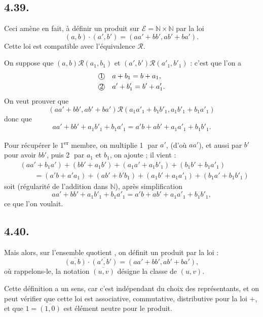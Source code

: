 \subsection*{4.39.}
Ceci amène en fait, à définir un produit sur $\mathcal E=\mathbb N\times\mathbb N$ par la loi
\[
(a,b)\cdot(a',b')=(aa'+bb',ab'+ba').
\]
Cette loi est compatible avec l'équivalence $\mathcal R$.

On suppose que $(a,b)\mathcal R(a_1,b_1)$ et $(a',b')\mathcal R(a'_1,b'_1)$ : c'est que l'on a
\begin{align*}
\text{\textcircled{1}}\quad &a+b_1=b+a_1,\\
\text{\textcircled{2}}\quad &a'+b'_1=b'+a'_1.
\end{align*}
On veut prouver que
\[
(aa'+bb',ab'+ba')\mathcal R(a_1a'_1+b_1b'_1,a_1b'_1+b_1a'_1)
\]
donc que
\[
aa'+bb'+a_1b'_1+b_1a'_1
=a'b+ab'+a_1a'_1+b_1b'_1.
\]

Pour récupérer le 1\textsuperscript{er} membre, on multiplie \textcircled{1} par $a'$, (d'où $aa'$), et aussi par $b'$ pour avoir $bb'$, puis \textcircled{2} par $a_1$ et $b_1$, on ajoute ; il vient :
\begin{align*}
&(aa'+b_1a')+(bb'+a_1b')+(a_1a'+a_1b'_1)+(b_1b'+b_1a'_1)\\
&\qquad=(a'b+a'a_1)+(ab'+b'b_1)+(a_1b'+a_1a'_1)+(b_1a'+b_1b'_1)
\end{align*}
soit (régularité de l'addition dans $\mathbb N$), après simplification
\[
aa'+bb'+a_1b'_1+b_1a'_1=a'b+ab'+a_1a'_1+b_1b'_1,
\]
ce que l'on voulait. \bookend

\subsection*{4.40.}
Mais alors, sur l'ensemble quotient , on définit un produit par la loi :
\[
\overline{(a,b)}\cdot\overline{(a',b')}
=\overline{(aa'+bb',ab'+ba')},
\]
où rappelons-le, la notation $\overline{(u,v)}$ désigne la classe de $(u,v)$.

Cette définition a un sens, car c'est indépendant du choix des représentants, et on peut vérifier que cette loi est associative, commutative, distributive pour la loi $+$, et que $1=\overline{(1,0)}$ est élément neutre pour le produit.

